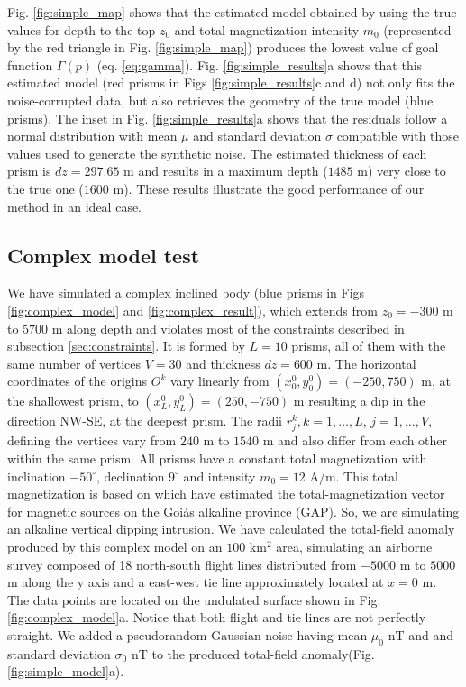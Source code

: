 Fig. \ref{fig:simple_map} shows that the estimated model obtained by using the true values for depth to the top $ z_0 $ and total-magnetization intensity $ m_0 $ (represented by the red triangle in Fig. \ref{fig:simple_map}) produces the lowest value of goal function  $ \Gamma(p) $ (eq. \ref{eq:gamma}). Fig. \ref{fig:simple_results}a shows that this estimated model (red prisms in Figs \ref{fig:simple_results}c and d) not only fits the noise-corrupted data, but also retrieves the geometry of the true model (blue prisms). The inset in Fig. \ref{fig:simple_results}a shows that the residuals follow a normal distribution with mean $ \mu $ and standard deviation $ \sigma $ compatible with those values used to generate 
the synthetic noise. The estimated thickness of each prism is $ dz = 297.65 $ m and  results in a maximum depth ($ 1485$ m) very close to the true one ($ 1600 $ m). 
These results illustrate the good performance of our method in an ideal case.

\subsection{Complex model test}

We have simulated a complex inclined body (blue prisms in Figs \ref{fig:complex_model} and \ref{fig:complex_result}), which extends from $z_0=-300$ m to $5700$ m along depth and violates most of the constraints described in subsection \ref{sec:constraints}. It is formed by $ L = 10 $ prisms, all of them with the same number of vertices $ V = 30 $ and thickness $ dz = 600 $ m. The horizontal coordinates of the origins $ O^k $ vary linearly from $ (x_0^0, y_0^0) = (-250, 750) $ m, at the shallowest prism, to $ (x_L^0, y_L^0) = (250, -750) $ m resulting a dip in the direction NW-SE, at the deepest prism. The radii $ r^k_j, k = 1, \dots, L$, $j = 1,\dots, V$, defining the vertices vary from $ 240 $ m to $ 1540 $ m and also differ from each other within the same prism. All prisms have a constant total magnetization with inclination $ -50^\circ $, declination $ 9^\circ $ and intensity $ m_0 = 12 $ A/m. This total magnetization is based on \cite{zhang-2018} which have estimated the total-magnetization vector for magnetic sources on the Goiás alkaline province (GAP). So, we are simulating an alkaline vertical dipping intrusion. We have calculated the total-field anomaly produced by this complex model on an $ 100 $ km$^2 $ area, simulating an airborne survey composed of 18 north-south flight lines distributed from $ -5000 $ m to $ 5000 $ m along the y axis and a east-west tie line approximately located at $ x = 0 $ m. The data points are located on the undulated surface shown in Fig. \ref{fig:complex_model}a. Notice that both flight and tie lines are not perfectly straight. We added a pseudorandom Gaussian noise having mean $ \mu_0$ nT and and standard deviation $ \sigma_0$ nT to the produced total-field anomaly(Fig. \ref{fig:simple_model}a).

